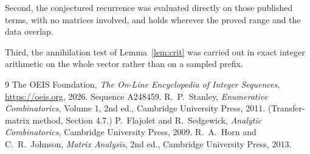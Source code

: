 \documentclass[11pt,a4paper]{article}
\theoremstyle{plain}
\theoremstyle{definition}
\begin{document}
Second, the conjectured recurrence was evaluated directly on those published terms, with no
matrices involved, and holds wherever the proved range and the data overlap.

Third, the annihilation test of Lemma~\ref{lem:crit} was carried out in exact integer
arithmetic on the whole vector rather than on a sampled prefix.

\begin{thebibliography}{9}
 The OEIS Foundation, \emph{The On-Line Encyclopedia of Integer
Sequences}, \url{https://oeis.org}, 2026. Sequence A248459.
 R.~P.~Stanley, \emph{Enumerative Combinatorics}, Volume 1, 2nd ed.,
Cambridge University Press, 2011. (Transfer-matrix method, Section 4.7.)
 P.~Flajolet and R.~Sedgewick, \emph{Analytic Combinatorics}, Cambridge
University Press, 2009.
 R.~A.~Horn and C.~R.~Johnson, \emph{Matrix Analysis}, 2nd ed., Cambridge
University Press, 2013.
\end{thebibliography}
\end{document}
